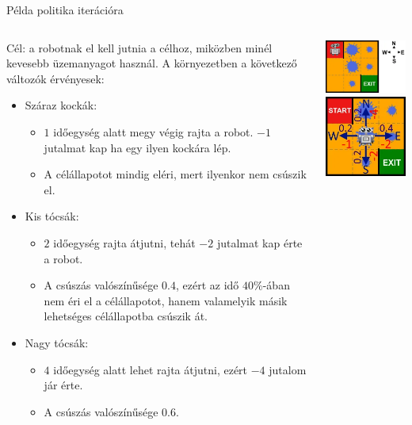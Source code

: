 \documentclass[english, aspectratio=169]{beamer}
\begin{document}
\begin{frame}{Példa politika iterációra}
\begin{columns}
\begin{column}{.8\textwidth}
Cél: a robotnak el kell jutnia a célhoz, miközben minél kevesebb üzemanyagot használ. A környezetben a következő változók érvényesek:
\begin{itemize}
	\item Száraz kockák:	
	\begin{itemize}
		\item $1$ időegység alatt megy végig rajta a robot. $-1$ jutalmat kap ha egy ilyen kockára lép.
		\item A célállapotot mindig eléri, mert ilyenkor nem csúszik el.
	\end{itemize}		
	\item Kis tócsák:
	\begin{itemize}
		\item $2$ időegység rajta átjutni, tehát $-2$ jutalmat kap érte a robot.
		\item A csúszás valószínűsége $0.4$, ezért az idő $40\%$-ában nem éri el a célállapotot, hanem valamelyik másik lehetséges célállapotba csúszik át.
	\end{itemize}
	\item Nagy tócsák:
	\begin{itemize}
		\item $4$ időegység alatt lehet rajta átjutni, ezért $-4$ jutalom jár érte.
		\item A csúszás valószínűsége $0.6$.
	\end{itemize}
\end{itemize}
\end{column}
\begin{column}{.2\textwidth}
\begin{center}
\includegraphics[width=3cm, keepaspectratio]{images/solving_12.png}
\vspace{1cm}
\includegraphics[width=3cm, keepaspectratio]{images/solving_13.png}
\end{center}
\end{column}
\end{columns}
\end{frame}
\end{document}
